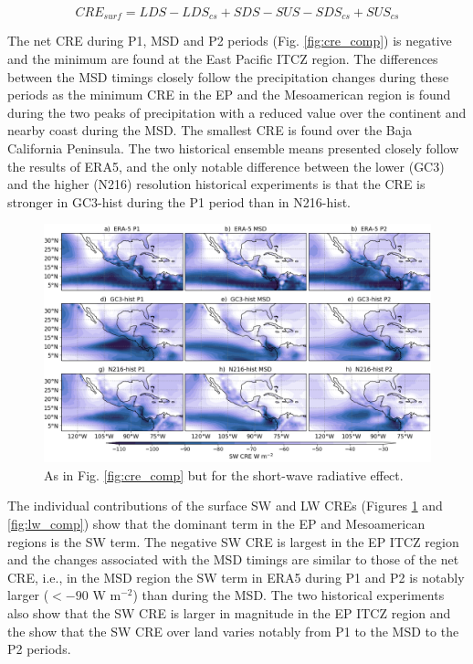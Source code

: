 \begin{equation}
CRE_{surf}=  LDS-LDS_{cs}+SDS-SUS-SDS_{cs}+SUS_{cs}
\end{equation}



The net CRE during P1, MSD and P2 periods (Fig. \ref{fig:cre_comp}) is negative  and the minimum are found at the East Pacific ITCZ region. The differences between the MSD timings closely follow the precipitation changes during these periods as the minimum CRE in the EP and the Mesoamerican region is found during the two peaks of precipitation with a reduced value over the continent and nearby coast during the MSD. The smallest CRE is found over the Baja California Peninsula. 
The two historical ensemble means presented closely follow the results of ERA5, and the only notable difference between the lower (GC3) and the higher (N216) resolution historical experiments is that the CRE is stronger in GC3-hist during the P1 period than in N216-hist.

\begin{figure}[t!]
\includegraphics[width=\linewidth]{figures/fig4_swclim_3.png}
\caption{As in Fig. \ref{fig:cre_comp} but for the short-wave radiative effect.}
\label{fig:sw_comp}
\end{figure}

The individual contributions of the surface SW and LW CREs (Figures \ref{fig:sw_comp} and \ref{fig:lw_comp}) show that the dominant term in the EP and Mesoamerican regions is the SW term. The negative SW CRE is largest in the EP ITCZ region and the changes associated with the MSD timings are similar to those of the net CRE, i.e., in the MSD region the SW term in ERA5 during P1 and P2 is notably larger ($<-90$ W m$^{-2}$) than during the MSD.
The two historical experiments also show that the SW CRE is larger in magnitude in the EP ITCZ region and the show that the SW CRE over land varies notably from P1 to the MSD to the P2 periods.

